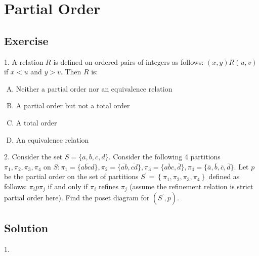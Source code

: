 \documentclass[12pt]{article}
\begin{document}
\section{Partial Order}
\subsection{Exercise}
	1. A relation $R$ is defined on ordered pairs of integers as follows: $(x,y) R(u,v)$ if $x < u$ and $y > v$. Then $R$ is:
	\begin{enumerate}[(A)]
		\item Neither a partial order nor an equivalence relation
		\item A partial order but not a total order
		\item A total order
		\item An equivalence relation
	\end{enumerate}
	\par 
	2. Consider the set $S=\{a, b, c, d\} .$ Consider the following 4 partitions $\pi_{1}, \pi_{2}, \pi_{3}, \pi_{4}$ on $S: \pi_{1}=\{\overline{a b c d}\}, \pi_{2}=\{\overline{a b}, \overline{c d}\}, \pi_{3}=\{\overline{a b c}, \bar{d}\}, \pi_{4}=\{\bar{a}, \bar{b}, \bar{c}, \bar{d}\} .$ Let $p$ be the partial order on the set of partitions $S^{\prime}=\left\{\pi_{1}, \pi_{2}, \pi_{3}, \pi_{4}\right\}$ defined as follows: $\pi_{i} p \pi_{j}$ if and only if $\pi_{i}$ refines $\pi_{j}$ (assume the refinement relation is strict partial order here). Find the poset diagram for $\left(S^{\prime}, p\right)$. 
\subsection{Solution}
	1.  
	
\end{document}
